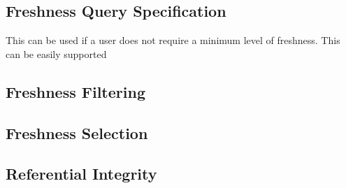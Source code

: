 \subsection{Freshness Query Specification}



This can be used if a user does not require a minimum level of freshness. This can be easily supported  


\subsection{Freshness Filtering}


\subsection{Freshness Selection}


\tocless\subsection{Referential Integrity}


